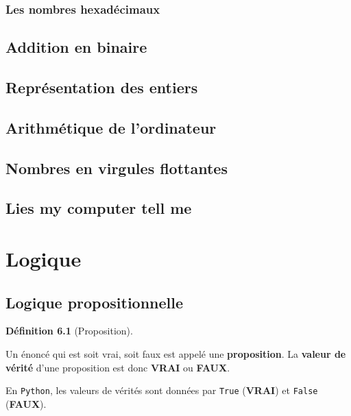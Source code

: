 \documentclass[
  letterpaper,
]{scrbook}
\theoremstyle{definition}
\newtheorem{definition}{Définition}[chapter]
\theoremstyle{definition}
\theoremstyle{remark}
\begin{document}
\hypertarget{les-nombres-hexaduxe9cimaux}{%
\subsection{Les nombres
hexadécimaux}\label{les-nombres-hexaduxe9cimaux}}

\hypertarget{addition-en-binaire}{%
\section{Addition en binaire}\label{addition-en-binaire}}

\hypertarget{repruxe9sentation-des-entiers-1}{%
\section{Représentation des
entiers}\label{repruxe9sentation-des-entiers-1}}

\hypertarget{arithmuxe9tique-de-lordinateur-1}{%
\section{Arithmétique de
l'ordinateur}\label{arithmuxe9tique-de-lordinateur-1}}

\hypertarget{nombres-en-virgules-flottantes}{%
\section{Nombres en virgules
flottantes}\label{nombres-en-virgules-flottantes}}

\hypertarget{lies-my-computer-tell-me}{%
\section{Lies my computer tell me}\label{lies-my-computer-tell-me}}


\hypertarget{logique}{%
\chapter{Logique}\label{logique}}

\hypertarget{logique-propositionnelle}{%
\section{Logique propositionnelle}\label{logique-propositionnelle}}

\leavevmode{}%
\begin{definition}[Proposition]\label{def-proposition}

Un énoncé qui est soit vrai, soit faux est appelé une
\textbf{proposition}. La \textbf{valeur de vérité} d'une proposition est
donc \textbf{VRAI} ou \textbf{FAUX}.

En \texttt{Python}, les valeurs de vérités sont données par
\texttt{True} (\textbf{VRAI}) et \texttt{False} (\textbf{FAUX}).

\end{definition}
\end{document}
